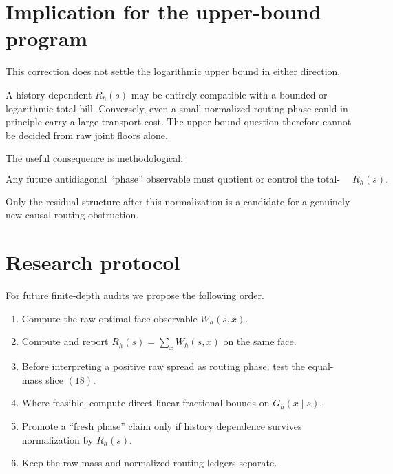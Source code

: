 \documentclass[11pt,a4paper]{article}
\begin{document}
\section{Implication for the upper-bound program}

This correction does not settle the logarithmic upper bound in either
direction.

A history-dependent \(R_h(s)\) may be entirely compatible with a bounded or
logarithmic total bill.  Conversely, even a small normalized-routing phase
could in principle carry a large transport cost.  The upper-bound question
therefore cannot be decided from raw joint floors alone.

The useful consequence is methodological:

\begin{equation}
\boxed{
\text{Any future antidiagonal ``phase'' observable must quotient or control
the total-mass coordinate }R_h(s).
}
\tag{20}
\end{equation}

Only the residual structure after this normalization is a candidate for a
genuinely new causal routing obstruction.

\section{Research protocol}

For future finite-depth audits we propose the following order.

\begin{enumerate}[leftmargin=2em]
\item Compute the raw optimal-face observable \(W_h(s,x)\).
\item Compute and report \(R_h(s)=\sum_xW_h(s,x)\) on the same face.
\item Before interpreting a positive raw spread as routing phase, test the
      equal-mass slice \((18)\).
\item Where feasible, compute direct linear-fractional bounds on
      \(G_h(x\mid s)\).
\item Promote a ``fresh phase'' claim only if history dependence survives
      normalization by \(R_h(s)\).
\item Keep the raw-mass and normalized-routing ledgers separate.
\end{enumerate}
\end{document}
